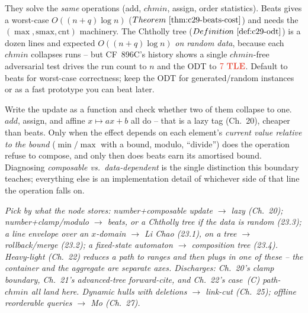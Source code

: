 \begin{notebox}
They solve the \emph{same} operations (add, \(\mathit{chmin}\), assign, order
statistics).  Beats gives a worst-case \(O((n+q)\log n)\)
(\(\thmref{c29-beats-cost}\)) and needs the \((\max,\mathrm{smax},\mathrm{cnt})\)
machinery.  The Chtholly tree (\(\defref{c29-odt}\)) is a dozen lines and expected
\(O((n+q)\log n)\) \emph{on random data}, because each \(\mathit{chmin}\) collapses
runs -- but CF~896C's history shows a single \(\mathit{chmin}\)-free adversarial test
drives the run count to \(n\) and the ODT to \(\tle\).  Default to beats for
worst-case correctness; keep the ODT for generated/random instances or as a fast
prototype you can beat later.
\end{notebox}

\begin{stuckbox}
Write the update as a function and check whether two of them collapse to one.
\(\mathit{add}\), assign, and affine \(x\mapsto ax+b\) all do -- that is a lazy tag
(Ch.~20), cheaper than beats.  Only when the effect depends on each element's
\emph{current value relative to the bound} (\(\min/\max\) with a bound, modulo,
``divide'') does the operation refuse to compose, and only then does beats earn its
amortised bound.  Diagnosing \emph{composable vs.\ data-dependent} is the single
distinction this boundary teaches; everything else is an implementation detail of
whichever side of that line the operation falls on.
\end{stuckbox}

\begin{recallbox}
\emph{Pick by what the node stores: number+composable update \(\to\) lazy
(Ch.~20); number+clamp/modulo \(\to\) beats, or a Chtholly tree if the data is
random (23.3); a line envelope over an \(x\)-domain \(\to\) Li Chao (23.1), on a
tree \(\to\) rollback/merge (23.2); a fixed-state automaton \(\to\) composition
tree (23.4).  Heavy-light (Ch.~22) reduces a path to ranges and then plugs in one
of these -- the container and the aggregate are separate axes.  Discharges:
Ch.~20's clamp boundary, Ch.~21's advanced-tree forward-cite, and Ch.~22's case~(C)
path-\(\mathit{chmin}\) all land here.  Dynamic hulls with deletions \(\to\)
link-cut (Ch.~25); offline reorderable queries \(\to\) Mo (Ch.~27).}
\end{recallbox}
